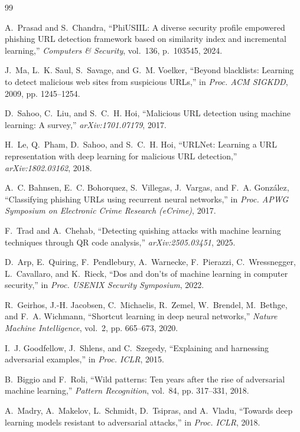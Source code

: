 \documentclass[conference]{IEEEtran}
\begin{document}
\begin{thebibliography}{99}

A.~Prasad and S.~Chandra, ``PhiUSIIL: A diverse security profile empowered phishing URL detection framework based on similarity index and incremental learning,'' \emph{Computers \& Security}, vol.~136, p.~103545, 2024.

J.~Ma, L.~K. Saul, S.~Savage, and G.~M. Voelker, ``Beyond blacklists: Learning to detect malicious web sites from suspicious URLs,'' in \emph{Proc. ACM SIGKDD}, 2009, pp. 1245--1254.

D.~Sahoo, C.~Liu, and S.~C.~H. Hoi, ``Malicious URL detection using machine learning: A survey,'' \emph{arXiv:1701.07179}, 2017.

H.~Le, Q.~Pham, D.~Sahoo, and S.~C.~H. Hoi, ``URLNet: Learning a URL representation with deep learning for malicious URL detection,'' \emph{arXiv:1802.03162}, 2018.

A.~C. Bahnsen, E.~C. Bohorquez, S.~Villegas, J.~Vargas, and F.~A. Gonz\'alez, ``Classifying phishing URLs using recurrent neural networks,'' in \emph{Proc. APWG Symposium on Electronic Crime Research (eCrime)}, 2017.

F.~Trad and A.~Chehab, ``Detecting quishing attacks with machine learning techniques through QR code analysis,'' \emph{arXiv:2505.03451}, 2025.

D.~Arp, E.~Quiring, F.~Pendlebury, A.~Warnecke, F.~Pierazzi, C.~Wressnegger, L.~Cavallaro, and K.~Rieck, ``Dos and don'ts of machine learning in computer security,'' in \emph{Proc. USENIX Security Symposium}, 2022.

R.~Geirhos, J.-H. Jacobsen, C.~Michaelis, R.~Zemel, W.~Brendel, M.~Bethge, and F.~A. Wichmann, ``Shortcut learning in deep neural networks,'' \emph{Nature Machine Intelligence}, vol.~2, pp. 665--673, 2020.

I.~J. Goodfellow, J.~Shlens, and C.~Szegedy, ``Explaining and harnessing adversarial examples,'' in \emph{Proc. ICLR}, 2015.

B.~Biggio and F.~Roli, ``Wild patterns: Ten years after the rise of adversarial machine learning,'' \emph{Pattern Recognition}, vol.~84, pp. 317--331, 2018.

A.~Madry, A.~Makelov, L.~Schmidt, D.~Tsipras, and A.~Vladu, ``Towards deep learning models resistant to adversarial attacks,'' in \emph{Proc. ICLR}, 2018.


\end{thebibliography}
\end{document}
